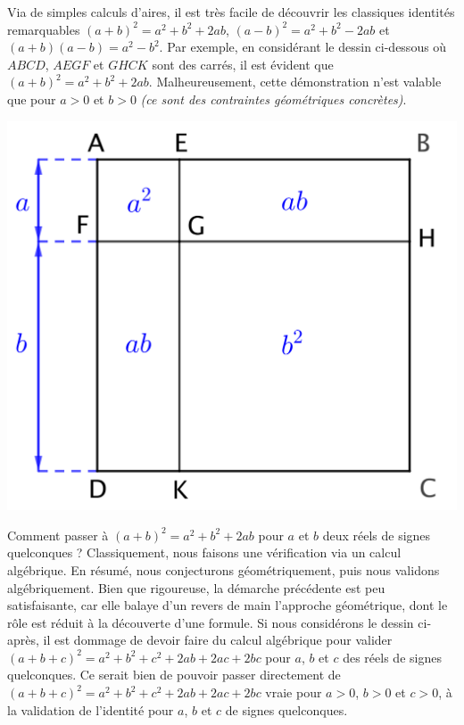 Via de simples calculs d'aires, il est très facile de découvrir les classiques identités remarquables
$(a + b)^2 = a^2 + b^2 + 2ab$,
$(a - b)^2 = a^2 + b^2 - 2ab$
et
$(a + b)(a - b) = a^2 - b^2$.
%
Par exemple, en considérant le dessin ci-dessous où $ABCD$, $AEGF$ et $GHCK$ sont des carrés,
il est évident que $(a + b)^2 = a^2 + b^2 + 2 ab$.
Malheureusement, cette démonstration n'est valable que pour $a > 0$ et $b > 0$ \emph{(ce sont des contraintes géométriques concrètes)}.

\begin{center}
	\includegraphics[scale = .7]{(a+b)^2.png}
\end{center}


Comment passer à $(a + b)^2 = a^2 + b^2 + 2 ab$ pour $a$ et $b$ deux réels de signes quelconques ?
Classiquement, nous faisons une vérification via un calcul algébrique.
%
En résumé, nous conjecturons géométriquement, puis nous validons algébriquement.
%
Bien que rigoureuse, la démarche précédente est peu satisfaisante, car elle balaye d'un revers de main l'approche géométrique, dont le rôle est réduit à la découverte d'une formule.
Si nous considérons le dessin ci-après, il est dommage de devoir faire du calcul algébrique pour valider $(a + b + c)^2 = a^2 + b^2 + c^2 + 2 ab + 2 ac + 2 bc$ pour $a$, $b$ et $c$ des réels de signes quelconques.
Ce serait bien de pouvoir passer directement de $(a + b + c)^2 = a^2 + b^2 + c^2 + 2 ab + 2 ac + 2 bc$ vraie pour $a > 0$, $b > 0$ et $c > 0$, à la validation de l'identité pour $a$, $b$ et $c$ de signes quelconques.

